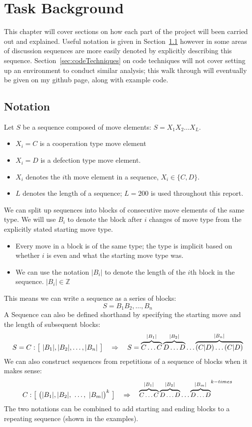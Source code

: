 
\chapter{Task Background}\label{ch:taskBackground}
This chapter will cover sections on how each part of the project will been carried out and explained.
Useful notation is given in Section~\ref{sec:notation} however in some areas of discussion sequences are more easily denoted by explicitly describing this sequence.
Section~\ref{sec:codeTechniques} on code techniques will not cover setting up an environment to conduct similar analysis;
this walk through will eventually be given on my github page, along with example code.

\section{Notation}\label{sec:notation}
Let \(S\) be a sequence composed of move elements: \(S = X_1 X_2 \ldots X_L\).
\begin{itemize}
    \item \(X_i=C\) is a cooperation type move element
    \item \(X_i=D\) is a defection type move element.
    \item \(X_i\) denotes the \(i\)th move element in a sequence, \(X_i \in \{C,D\}\).
    \item \(L\) denotes the length of a sequence; \(L=200\) is used throughout this report.
\end{itemize}

We can split up sequences into blocks of consecutive move elements of the same type.
We will use \(B_i\) to denote the block after \(i\) changes of move type from the explicitly stated starting move type.
\begin{itemize}
    \item Every move in a block is of the same type;
    the type is implicit based on whether \(i\) is even and what the starting move type was.
    \item We can use the notation \(|B_i|\) to denote the length of the \(i\)th block in the sequence. \(|B_i| \in \mathbb{Z}\)
\end{itemize}

This means we can write a sequence as a series of blocks:
\[S= B_1 B_2,\ldots,B_n\]
A Sequence can also be defined shorthand by specifying the starting move and the length of subsequent blocks:
\[S = C:\big{[}\ |B_1|,|B_2|,\ldots,|B_n|\ \big{]} \quad \Rightarrow \quad S=\overbrace{C\ldots C}^{|B_1|}\overbrace{D\ldots D}^{|B_2|}\ldots\overbrace{(C|D)\ldots (C|D)}^{|B_n|} \]
We can also construct sequences from repetitions of a sequence of blocks when it makes sense:
\[C:\big{[}\ \big{(}|B_1|,|B_2|,\ \ldots,\ |B_m|\big{)}^{k}\ \big{]} \quad \Rightarrow \quad {\small{\overbrace{C\ldots C}^{|B_1|}\overbrace{D\ldots D}^{|B_2|}\ldots\overbrace{D\ldots D}^{|B_m|}}}^{k-times}\]
The two notations can be combined to add starting and ending blocks to a repeating sequence (shown in the examples).\\

